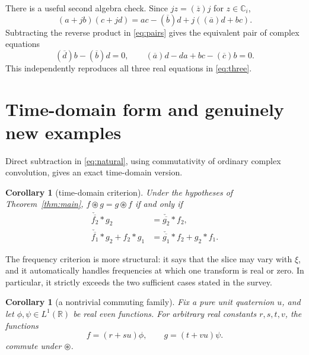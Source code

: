 \documentclass[11pt]{article}
\newtheorem{corollary}[theorem]{Corollary}
\newcommand{\C}{\mathbb C}
\newcommand{\R}{\mathbb R}
\newcommand{\ostar}{\mathbin{\circledast}}
\begin{document}
There is a useful second algebra check.  Since $jz=(\overline z)j$ for
$z\in\C_i$,
\begin{equation}\label{eq:pairs}
(a+jb)(c+jd)=ac-(\overline b)d
             +j((\overline a)d+bc).
\end{equation}
Subtracting the reverse product in \eqref{eq:pairs} gives the equivalent pair
of complex equations
\begin{equation}\label{eq:complexcriterion}
 (\overline d)b-(\overline b)d=0,
 \qquad
 (\overline a)d-da+bc-(\overline c)b=0.
\end{equation}
This independently reproduces all three real equations in
\eqref{eq:three}.

\section{Time-domain form and genuinely new examples}

Direct subtraction in \eqref{eq:natural}, using commutativity of ordinary
complex convolution, gives an exact time-domain version.

\begin{corollary}[time-domain criterion]\label{cor:time}
Under the hypotheses of Theorem~\ref{thm:main}, $f\ostar g=g\ostar f$ if and
only if
\begin{align}
 \check{\overline{f_2}}*g_2
   &=\check{\overline{g_2}}*f_2,                       \label{eq:time1}\\
 \check{\overline{f_1}}*g_2+f_2*g_1
   &=\check{\overline{g_1}}*f_2+g_2*f_1.              \label{eq:time2}
\end{align}
\end{corollary}

The frequency criterion is more structural: it says that the slice may vary
with $\xi$, and it automatically handles frequencies at which one transform
is real or zero.  In particular, it strictly exceeds the two sufficient
cases stated in the survey.

\begin{corollary}[a nontrivial commuting family]\label{cor:example}
Fix a pure unit quaternion $u$, and let $\phi,\psi\in L^1(\R)$ be real even
functions.  For arbitrary real constants $r,s,t,v$, the functions
\begin{equation}\label{eq:family}
             f=(r+su)\phi,\qquad g=(t+vu)\psi.
\end{equation}
commute under $\ostar$.
\end{corollary}
\end{document}
